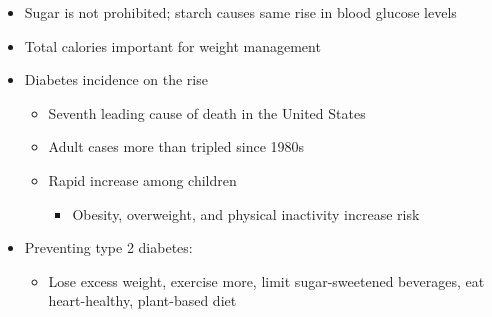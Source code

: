 \documentclass[12pt]{article}
\begin{document}
\begin{itemize}
                \item Sugar is not prohibited; starch causes same rise in blood glucose levels
                \item Total calories important for weight management
                \item Diabetes incidence on the rise
                    \begin{itemize}
                        \item Seventh leading cause of death in the United States
                        \item Adult cases more than tripled since 1980s
                        \item Rapid increase among children
                            \begin{itemize}
                                \item Obesity, overweight, and physical inactivity increase risk
                            \end{itemize}
                    \end{itemize}
                \item Preventing type 2 diabetes:
                    \begin{itemize}
                        \item Lose excess weight, exercise more, limit sugar-sweetened beverages, eat heart-healthy, plant-based diet
                    \end{itemize}
            \end{itemize}
\end{document}
